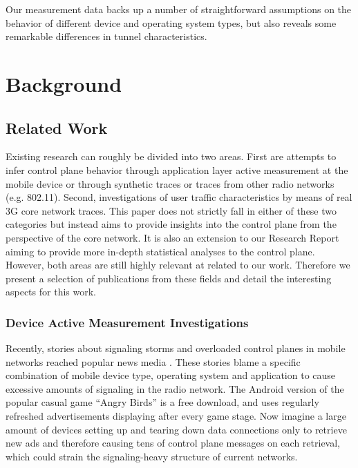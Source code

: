 Our measurement data backs up a number of straightforward assumptions on the behavior of different device and operating system types, but also reveals some remarkable differences in tunnel characteristics.\\





\section{Background}
\label{c4:background}


\subsection{Related Work}
Existing research can roughly be divided into two areas. First are attempts to infer control plane behavior through application layer active measurement at the mobile device or through synthetic traces or traces from other radio networks (e.g. 802.11).
Second, investigations of user traffic characteristics by means of real 3G core network traces.
This paper does not strictly fall in either of these two categories but instead aims to provide insights into the control plane from the perspective of the core network. It is also an extension to our Research Report\cite{metzger2012research} aiming to provide more in-depth statistical analyses to the control plane.  
However, both areas are still highly relevant at related to our work. Therefore we present a selection of publications from these fields and detail the interesting aspects for this work.

\subsubsection{Device Active Measurement Investigations}

Recently, stories about signaling storms and overloaded control planes in mobile networks reached popular news media \cite{it2011birdandroid, lt2012docostorm}. These stories blame a specific combination of mobile device type, operating system and application to cause excessive amounts of signaling in the radio network. The Android version of the popular casual game ``Angry Birds'' is a free download, and uses regularly refreshed advertisements displaying after every game stage. Now imagine a large amount of devices setting up and tearing down data connections only to retrieve new ads and therefore causing tens of control plane messages on each retrieval, which could strain the signaling-heavy structure of current networks. 

